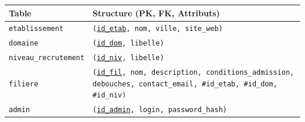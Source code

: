 \documentclass[11pt]{article}
\begin{document}
\begin{center}
\begin{tabularx}{\linewidth}{|l|X|}\hline
\textbf{Table} & \textbf{Structure (PK, FK, Attributs)} \\\hline
\texttt{etablissement} & \texttt{(\underline{id\_etab}, nom, ville, site\_web)} \\\hline
\texttt{domaine} & \texttt{(\underline{id\_dom}, libelle)} \\\hline
\texttt{niveau\_recrutement} & \texttt{(\underline{id\_niv}, libelle)} \\\hline
\texttt{filiere} & \texttt{(\underline{id\_fil}, nom, description, conditions\_admission, debouches, contact\_email, \#id\_etab, \#id\_dom, \#id\_niv)} \\\hline
\texttt{admin} & \texttt{(\underline{id\_admin}, login, password\_hash)} \\\hline
\end{tabularx}
\end{center}
\end{document}
